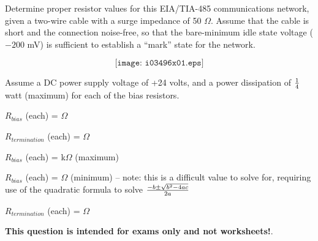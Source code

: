

Determine proper resistor values for this EIA/TIA-485 communications network, given a two-wire cable with a surge impedance of 50 $\Omega$.  Assume that the cable is short and the connection noise-free, so that the bare-minimum idle state voltage ($-200$ mV) is sufficient to establish a ``mark'' state for the network.

$$\texttt{[image: i03496x01.eps]}$$

Assume a DC power supply voltage of +24 volts, and a power dissipation of $1 \over 4$ watt (maximum) for each of the bias resistors.

\vskip 10pt

$R_{bias}$ (each) = \underbar{\hskip 50pt} $\Omega$

\vskip 10pt

$R_{termination}$ (each) = \underbar{\hskip 50pt} $\Omega$







$R_{bias}$ (each) =  k$\Omega$ (maximum)

$R_{bias}$ (each) =  $\Omega$ (minimum) -- note: this is a difficult value to solve for, requiring use of the quadratic formula to solve ${-b \pm \sqrt{b^2 - 4ac}} \over 2a$

\vskip 10pt

$R_{termination}$ (each) =  $\Omega$







{\bf This question is intended for exams only and not worksheets!}.



